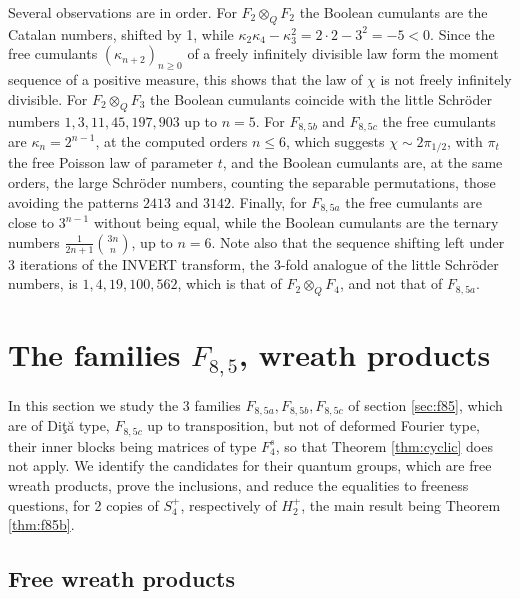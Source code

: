 \documentclass[11pt]{amsart}
\begin{document}
\noindent Several observations are in order. For $F_2\otimes_QF_2$ the Boolean cumulants are the Catalan numbers, shifted by 1, while $\kappa_2\kappa_4-\kappa_3^2=2\cdot2-3^2=-5<0$. Since the free cumulants $(\kappa_{n+2})_{n\geq0}$ of a freely infinitely divisible law form the moment sequence of a positive measure, this shows that the law of $\chi$ is not freely infinitely divisible. For $F_2\otimes_QF_3$ the Boolean cumulants coincide with the little Schr\"oder numbers $1,3,11,45,197,903$ up to $n=5$. For $F_{8,5b}$ and $F_{8,5c}$ the free cumulants are $\kappa_n=2^{n-1}$, at the computed orders $n\leq6$, which suggests $\chi\sim2\pi_{1/2}$, with $\pi_t$ the free Poisson law of parameter $t$, and the Boolean cumulants are, at the same orders, the large Schr\"oder numbers, counting the separable permutations, those avoiding the patterns $2413$ and $3142$. Finally, for $F_{8,5a}$ the free cumulants are close to $3^{n-1}$ without being equal, while the Boolean cumulants are the ternary numbers $\frac{1}{2n+1}\binom{3n}{n}$, up to $n=6$. Note also that the sequence shifting left under 3 iterations of the INVERT transform, the 3-fold analogue of the little Schr\"oder numbers, is $1,4,19,100,562$, which is that of $F_2\otimes_QF_4$, and not that of $F_{8,5a}$.

\section{The families \texorpdfstring{$F_{8,5}$}{F(8,5)}, wreath products}\label{sec:f85q}

In this section we study the 3 families $F_{8,5a},F_{8,5b},F_{8,5c}$ of section \ref{sec:f85}, which are of Di\c t\u a type, $F_{8,5c}$ up to transposition, but not of deformed Fourier type, their inner blocks being matrices of type $F_4^s$, so that Theorem \ref{thm:cyclic} does not apply. We identify the candidates for their quantum groups, which are free wreath products, prove the inclusions, and reduce the equalities to freeness questions, for 2 copies of $S_4^+$, respectively of $H_2^+$, the main result being Theorem \ref{thm:f85b}.

\subsection{Free wreath products}
\end{document}
